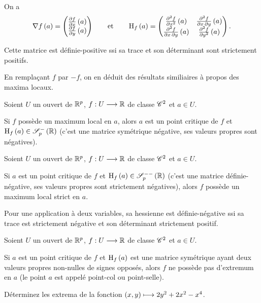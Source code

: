 On a \[\nabla f\left(a\right)=\begin{pmatrix}\pdv{f}{x}\left(a\right)\\\pdv{f}{y}\left(a\right)\end{pmatrix}\qquad\text{et}\qquad\operatorname{H}_{f}\left(a\right)=\begin{pmatrix}
\pdv[order=2]{f}{x}\left(a\right) & \pdv{f}{x,y}\left(a\right) \\
\pdv{f}{x,y}\left(a\right) & \pdv[order=2]{f}{y}\left(a\right)
\end{pmatrix}.\]

Cette matrice est définie-positive ssi sa trace et son déterminant sont strictement positifs.

En remplaçant \(f\) par \(-f\), on en déduit des résultats similiaires à propos des maxima locaux.

\begin{prop}
Soient \(U\) un ouvert de \(\mathbb{R}^p\), \(f:U\longrightarrow\mathbb{R}\) de classe \(\mathscr{C}^{2}\) et \(a\in U\).

Si \(f\) possède un maximum local en \(a\), alors \(a\) est un point critique de \(f\) et \(\hessienne{f}\paren{a}\in\symneg{p}[\R]\) (\ie c'est une matrice symétrique négative, ses valeurs propres sont négatives).
\end{prop}

\begin{prop}
Soient \(U\) un ouvert de \(\mathbb{R}^p\), \(f:U\longrightarrow\mathbb{R}\) de classe \(\mathscr{C}^{2}\) et \(a\in U\).

Si \(a\) est un point critique de \(f\) et \(\hessienne{f}\paren{a}\in\symdefneg{p}[\R]\) (\ie c'est une matrice définie-négative, ses valeurs propres sont strictement négatives), alors \(f\) possède un maximum local strict en \(a\).
\end{prop}

Pour une application à deux variables, sa hessienne est définie-négative ssi sa trace est strictement négative et son déterminant strictement positif.

\begin{prop}
Soient \(U\) un ouvert de \(\mathbb{R}^p\), \(f:U\longrightarrow\mathbb{R}\) de classe \(\mathscr{C}^{2}\) et \(a\in U\).

Si \(a\) est un point critique de \(f\) et \(\operatorname{H}_{f}\left(a\right)\) est une matrice symétrique ayant deux valeurs propres non-nulles de signes opposés, alors \(f\) ne possède pas d'extremum en \(a\) (le point \(a\) est appelé point-col ou point-selle).
\end{prop}

\begin{exo}
Déterminez les extrema de la fonction \(\left(x,y\right)\longmapsto2y^2+2x^2-x^4\).
\end{exo}

